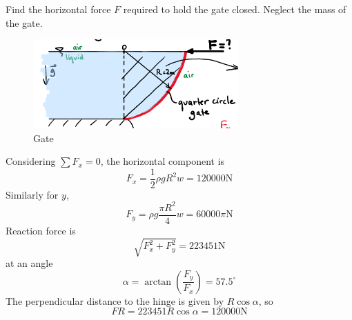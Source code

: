 \documentclass[12pt]{article}
\begin{document}
\begin{ex}
	Find the horizontal force $F$ required to hold the gate closed. Neglect the mass of the gate.

	\begin{figure}
		\centering
		\caption{Gate}
		\label{gate2}
		\includegraphics[width=0.7\textwidth]{gate2.png}
	\end{figure}

	Considering $\sum F_x = 0$, the horizontal component is
	$$F_x = \frac{1}{2}\rho g R^2w = 120000\text{N}$$
	Similarly for $y$,
	$$F_y = \rho g \frac{\pi R^2}{4}w = 60000\pi\text{N}$$
	Reaction force is
	$$\sqrt{F_x^2 + F_y^2} = 223451\text{N}$$
	at an angle
	$$\alpha = \arctan\left(\frac{F_y}{F_x}\right) = 57.5^\circ$$
	The perpendicular distance to the hinge is given by $R\cos\alpha$, so
	$$FR = 223451R\cos\alpha = 120000\text{N}$$
\end{ex}
\end{document}
